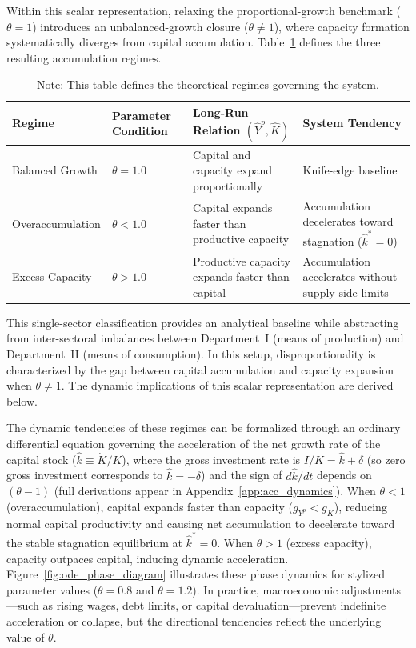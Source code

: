 Within this scalar representation, relaxing the proportional-growth benchmark ($\theta = 1$) introduces an unbalanced-growth closure ($\theta \neq 1$), where capacity formation systematically diverges from capital accumulation. Table~\ref{tab:growth_regimes} defines the three resulting accumulation regimes.

\begin{table}[H]
\centering
\caption{Accumulation Regimes and the Productive-Capacity Relation}
\label{tab:growth_regimes}
\small
\begin{tabular}{@{}>{\raggedright\arraybackslash}p{3.2cm}>{\centering\arraybackslash}p{1.8cm}>{\raggedright\arraybackslash}p{4.2cm}>{\raggedright\arraybackslash}p{4.0cm}@{}}
\toprule
Regime & Parameter Condition & Long-Run Relation $(\hat{Y}^p,\hat{K})$ & System Tendency \\
\midrule
\midrule
Balanced Growth & $\theta = 1.0$ & Capital and capacity expand proportionally & Knife-edge baseline \\
Overaccumulation & $\theta < 1.0$ & Capital expands faster than productive capacity & Accumulation decelerates toward stagnation ($\hat{k}^* = 0$) \\
Excess Capacity & $\theta > 1.0$ & Productive capacity expands faster than capital & Accumulation accelerates without supply-side limits \\
\bottomrule
\end{tabular}
\caption*{\footnotesize Note: This table defines the theoretical regimes governing the system.}
\end{table}

This single-sector classification provides an analytical baseline while abstracting from inter-sectoral imbalances between Department~I (means of production) and Department~II (means of consumption). In this setup, disproportionality is characterized by the gap between capital accumulation and capacity expansion when $\theta \neq 1$. The dynamic implications of this scalar representation are derived below.

The dynamic tendencies of these regimes can be formalized through an ordinary differential equation governing the acceleration of the net growth rate of the capital stock ($\hat{k} \equiv \dot{K}/K$), where the gross investment rate is $I/K = \hat{k} + \delta$ (so zero gross investment corresponds to $\hat{k} = -\delta$) and the sign of $d\hat{k}/dt$ depends on $(\theta - 1)$ (full derivations appear in Appendix~\ref{app:acc_dynamics}). When $\theta < 1$ (overaccumulation), capital expands faster than capacity ($g_{Y^p} < g_K$), reducing normal capital productivity and causing net accumulation to decelerate toward the stable stagnation equilibrium at $\hat{k}^* = 0$. When $\theta > 1$ (excess capacity), capacity outpaces capital, inducing dynamic acceleration. Figure~\ref{fig:ode_phase_diagram} illustrates these phase dynamics for stylized parameter values ($\theta = 0.8$ and $\theta = 1.2$). In practice, macroeconomic adjustments---such as rising wages, debt limits, or capital devaluation---prevent indefinite acceleration or collapse, but the directional tendencies reflect the underlying value of $\theta$.

